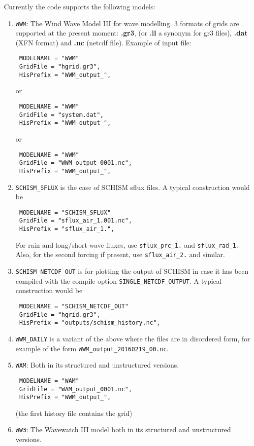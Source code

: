 \documentclass[12pt]{amsart}
\begin{document}
Currently the code supports the following models:
\begin{enumerate}
\item {\tt WWM}: The Wind Wave Model III for wave modelling. 3 formats of grids are supported at the present moment: {\bf .gr3}, (or {\bf .ll} a synonym for gr3 files), {\bf .dat} (XFN format) and {\bf .nc} (netcdf file).
Example of input file:
\begin{verbatim}
 MODELNAME = "WWM"
 GridFile = "hgrid.gr3",
 HisPrefix = "WWM_output_",
\end{verbatim}
or 
\begin{verbatim}
 MODELNAME = "WWM"
 GridFile = "system.dat",
 HisPrefix = "WWM_output_",
\end{verbatim}
or
\begin{verbatim}
 MODELNAME = "WWM"
 GridFile = "WWM_output_0001.nc",
 HisPrefix = "WWM_output_",
\end{verbatim}
\item {\tt SCHISM\_SFLUX} is the case of SCHISM sflux files. A typical construction would be
\begin{verbatim}
 MODELNAME = "SCHISM_SFLUX"
 GridFile = "sflux_air_1.001.nc",
 HisPrefix = "sflux_air_1.",
\end{verbatim}
For rain and long/short wave fluxes, use {\tt sflux\_prc\_1.} and {\tt sflux\_rad\_1.} Also, for the second forcing if present, use {\tt sflux\_air\_2.} and similar.
\item {\tt SCHISM\_NETCDF\_OUT} is for plotting the output of SCHISM in case it has been compiled with the compile option {\tt SINGLE\_NETCDF\_OUTPUT}. A typical construction would be
\begin{verbatim}
 MODELNAME = "SCHISM_NETCDF_OUT"
 GridFile = "hgrid.gr3",
 HisPrefix = "outputs/schism_history.nc",
\end{verbatim}
\item {\tt WWM\_DAILY} is a variant of the above where the files are in disordered form, for example of the form {\tt WWM\_output\_20160219\_00.nc}.
\item {\tt WAM}: Both in its structured and unstructured versions.
\begin{verbatim}
 MODELNAME = "WAM"
 GridFile = "WAM_output_0001.nc",
 HisPrefix = "WWM_output_",
\end{verbatim}
(the first history file contains the grid)
\item {\tt WW3}: The Wavewatch III model both in its structured and unstructured versions.
\begin{verbatim}

\end{verbatim}
\end{enumerate}
\end{document}
